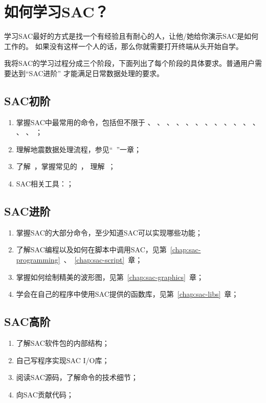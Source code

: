 \section{如何学习SAC？}
学习SAC最好的方式是找一个有经验且有耐心的人，让他/她给你演示SAC是如何工作的。
如果没有这样一个人的话，那么你就需要打开终端从头开始自学。

我将SAC的学习过程分成三个阶段，下面列出了每个阶段的具体要求。普通用户需要达到``SAC进阶''
才能满足日常数据处理的要求。

\subsection*{SAC初阶}
\begin{enumerate}
    \item 掌握SAC中最常用的命令，包括但不限于
            、
            、
            、
            、
            、
            、
            、
            、
            、
            、
            、
            、
            、
            、
            ；
        \item 理解地震数据处理流程，参见``~''一章；
        \item 了解~，掌握常见的~，
            理解~；
        \item SAC相关工具：；
\end{enumerate}

\subsection*{SAC进阶}
\begin{enumerate}
\item 掌握SAC的大部分命令，至少知道SAC可以实现哪些功能；
\item 了解SAC编程以及如何在脚本中调用SAC，见第~\ref{chap:sac-programming}~、~\ref{chap:sac-script}~章；
\item 掌握如何绘制精美的波形图，见第~\ref{chap:sac-graphics}~章；
\item 学会在自己的程序中使用SAC提供的函数库，见第~\ref{chap:sac-libs}~章；
\end{enumerate}

\subsection*{SAC高阶}
\begin{enumerate}
\item 了解SAC软件包的内部结构；
\item 自己写程序实现SAC I/O库；
\item 阅读SAC源码，了解命令的技术细节；
\item 向SAC贡献代码；
\end{enumerate}
